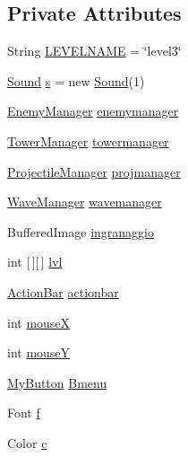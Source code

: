 \subsection*{Private Attributes}
\begin{DoxyCompactItemize}
\item 
String \hyperlink{classscenes_1_1_level3_a4965d4285aad63d850d0917b23e3f11f}{L\+E\+V\+E\+L\+N\+A\+ME} = \char`\"{}level3\char`\"{}
\item 
\hyperlink{classprogetto_1_1_sound}{Sound} \hyperlink{classscenes_1_1_level3_a76e9e53c877d84187e0efb78f03c86d4}{s} = new \hyperlink{classprogetto_1_1_sound}{Sound}(1)
\item 
\hyperlink{classmanagers_1_1_enemy_manager}{Enemy\+Manager} \hyperlink{classscenes_1_1_level3_a1f593b74cc45d79b21ce59953aa8118f}{enemymanager}
\item 
\hyperlink{classmanagers_1_1_tower_manager}{Tower\+Manager} \hyperlink{classscenes_1_1_level3_a1340930f4499459346af3af2d24e3d3e}{towermanager}
\item 
\hyperlink{classmanagers_1_1_projectile_manager}{Projectile\+Manager} \hyperlink{classscenes_1_1_level3_aee34cf906685787259a2edd7d4559863}{projmanager}
\item 
\hyperlink{classmanagers_1_1_wave_manager}{Wave\+Manager} \hyperlink{classscenes_1_1_level3_a53367ff9cb3d994463429a1103e0ce6a}{wavemanager}
\item 
Buffered\+Image \hyperlink{classscenes_1_1_level3_ab0c4ea45989823c211fa4034d743f36b}{ingranaggio}
\item 
int \mbox{[}$\,$\mbox{]}\mbox{[}$\,$\mbox{]} \hyperlink{classscenes_1_1_level3_a4b06a2210cf5b93dda77f2a9a061d538}{lvl}
\item 
\hyperlink{classui_1_1_action_bar}{Action\+Bar} \hyperlink{classscenes_1_1_level3_aa73d545c6ea02ea24a244ba02a329b28}{actionbar}
\item 
int \hyperlink{classscenes_1_1_level3_a85ea1b63086b31a15d3ed2579c5715a6}{mouseX}
\item 
int \hyperlink{classscenes_1_1_level3_a3637abebcaa9d04aa18b1610d0921e16}{mouseY}
\item 
\hyperlink{classui_1_1_my_button}{My\+Button} \hyperlink{classscenes_1_1_level3_a3bcc199bdb1d50c111054398694c7473}{Bmenu}
\item 
Font \hyperlink{classscenes_1_1_level3_a3fb562f10e8f7f83cb2ed130eab6d439}{f}
\item 
Color \hyperlink{classscenes_1_1_level3_a02094092ae89aa4b23bff1976bcbf90d}{c}
\item 

\end{DoxyCompactItemize}
